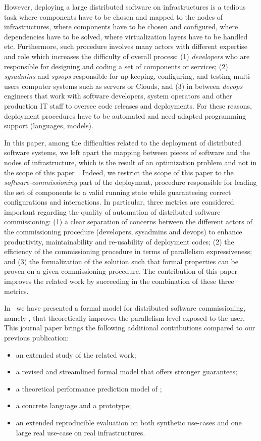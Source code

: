 However, deploying a large distributed software on infrastructures is a tedious task where components have to be chosen and mapped to the nodes of infrastructures, where components have to be chosen and configured, where dependencies have to be solved, where virtualization layers have to be handled etc. Furthermore, such procedure involves many actors with different expertise and role which increases the difficulty of overall process: (1) \emph{developers} who are responsible for designing and coding a set of components or services; (2) \emph{sysadmins} and \emph{sysops} responsible for up-keeping, configuring, and testing multi-users computer systems such as servers or Clouds, and (3) in between \emph{devops} engineers that work with software developers, system operators and other production IT staff to oversee code releases and deployments. For these reasons, deployment procedures have to be automated and need adapted programming support (\ie languages, models).

In this paper, among the difficulties related to the deployment of distributed software systems, we left apart the mapping between pieces of software and the nodes of infrastructure, which is the result of an optimization problem and not in the scope of this paper~\cite{6409358, 10.1007/978-3-319-47677-3_15, cadorel:hal-02165835, ccgridemile, 10.5555/2432523.2432528}. Indeed, we restrict the scope of this paper to the \emph{software-commissioning} part of the deployment, \ie procedure responsible for leading the set of components to a valid running state while guaranteeing correct configurations and interactions.
%
In particular, three metrics are considered important regarding the quality of automation of distributed software commissioning: (1) a clear separation of concerns between the different actors of the commissioning procedure (\ie developers, sysadmins and devops) to enhance productivity, maintainability
and re-usability of deployment codes; (2) the efficiency of the commissioning procedure in terms of parallelism expressiveness; and (3) the formalization of the solution such that formal properties can be proven on a given commissioning procedure. The contribution of this paper improves the related work by succeeding in the combination of these three metrics.
%

In~\cite{chardet:hal-01858150} we have presented a formal model for distributed software commissioning, namely \mad, that theoretically improves the parallelism
level exposed to the user. This journal paper brings the following additional
contributions compared to our previous publication: 
\begin{itemize} 
	\item an extended study of the related work; 
	\item a revised and streamlined \mad formal	model that offers stronger guarantees; 
	\item a theoretical performance prediction model of \mad; 
	\item a concrete language and a prototype;
	\item an extended reproducible evaluation on both synthetic use-cases and one large real use-case on real infrastructures.
\end{itemize}

